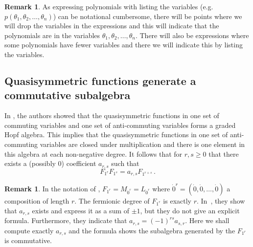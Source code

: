 \documentclass[11pt]{amsart}
\theoremstyle{definition}
\newtheorem{remark}[theorem]{Remark}
\numberwithin{equation}{section}
\begin{document}
\begin{remark}
As expressing polynomials with listing the variables
(e.g. $p(\theta_1, \theta_2, \ldots, \theta_n)$) can be notational cumbersome,
there will be points where we will drop the variables in the expressions
and this will indicate that the polynomials are in the
variables $\theta_1, \theta_2, \ldots, \theta_n$.  There will also
be expressions where some polynomials have fewer variables and there
we will indicate this by listing the variables.
\end{remark}

\subsection{Quasisymmetric functions generate a commutative subalgebra}
In \cite{FLP}, the authors showed that the quasisymmetric functions in
one set of commuting variables and one set of anti-commuting variables
forms a graded Hopf algebra.  This implies that the quasisymmetric functions
in one set of anti-commuting variables are closed under multiplication
and there is one element in this algebra at each non-negative degree.
It follows that for $r, s \geq0$ that there exists a (possibly $0$)
coefficient $a_{r,s}$ such that
\begin{equation}\label{eq:qsalg}
F_{1^r} F_{1^s} = a_{r,s} F_{1^{r+s}}\,.
\end{equation}

\begin{remark}
In  the notation of \cite{FLP}, $F_{1^r}=M_{\dot{0}^r}=L_{\dot{0}^r}$ where $\dot{0}^r=(\dot{0},\dot{0},\ldots,\dot{0})$ a composition of length $r$.
The fermionic degree of $F_{1^r}$ is exactly $r$.
 In~\cite{FLP}, they show that $a_{r,s}$ exists and express it as a sum of $\pm 1$, but they do not give an explicit formula.
Furthermore, they indicate  that $a_{r,s}=(-1)^{rs}a_{s,r}$. Here we shall compute exactly $a_{r,s}$
and the formula shows the subalgebra generated by the $F_{1^r}$ is commutative.
\end{remark}
\end{document}
